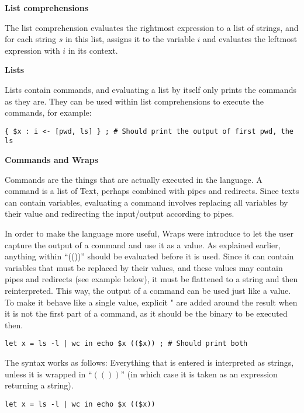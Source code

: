 \documentclass[11pt,a4paper]{article}
\begin{document}
\textbf{List comprehensions}

The list comprehension evaluates the rightmost expression to a list of strings,
and for each string $s$ in this list, assigns it to the variable $i$ and
evaluates the leftmost expression with $i$ in its context.

\textbf{Lists}

Lists contain commands, and evaluating a list by itself only prints the
commands as they are. They can be used within list comprehensions to execute
the commands, for example:

\begin{verbatim}
{ $x : i <- [pwd, ls] } ; # Should print the output of first pwd, the ls
\end{verbatim}

\textbf{Commands and Wraps}

Commands are the things that are actually executed in the language. A command
is a list of Text, perhaps combined with pipes and redirects. Since texts can
contain variables, evaluating a command involves replacing all variables by
their value and redirecting the input/output according to pipes.

In order to make the language more useful, Wraps were introduce to let the user
capture the output of a command and use it as a value. As explained earlier,
anything within ``(())'' should be evaluated before it is used. Since it can
contain variables that must be replaced by their values, and these values may
contain pipes and redirects (see example below), it must be flattened to a
string and then reinterpreted. This way, the output of a command can be used
just like a value. To make it behave like a single value, explicit " are added
around the result when it is not the first part of a command, as it should be
the binary to be executed then.

\begin{verbatim}
let x = ls -l | wc in echo $x (($x)) ; # Should print both
\end{verbatim}




The syntax works as follows: Everything that is entered is interpreted as
strings, unless it is wrapped in ``$\left( \left(  \right) \right)$'' (in which
case it is taken as an expression returning a string).

\begin{verbatim}
let x = ls -l | wc in echo $x (($x))
\end{verbatim}
\end{document}
